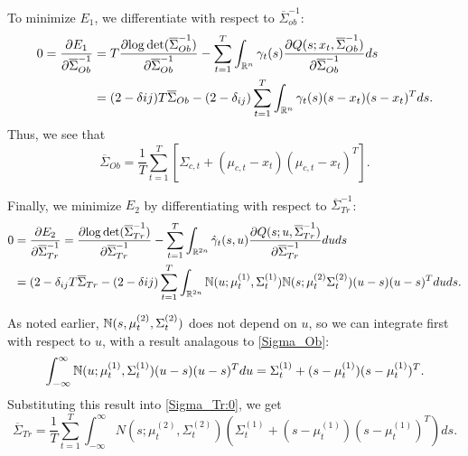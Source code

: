 \documentclass[12pt,leqno]{article}
\begin{document}
To minimize $E_1$, we differentiate with respect to $\overline{\Sigma}_{ob}^{-1}$:
\begin{align*}
  0 = \frac{\partial{E_1}}{\partial{\overline{\Sigma}_{Ob}^{-1}}} &= T\frac{\partial{\log\det(\overline{\Sigma}_{Ob}^{-1})}}{\partial\overline{\Sigma}_{Ob}^{-1}}
  - \sum_{t=1}^T\int_{{\mathbb R}^n}\gamma_t(s)\frac{\partial{Q(s;x_t,\overline{\Sigma}_{Ob}^{-1})}}{\partial{\overline{\Sigma}_{Ob}^{-1}}}ds \\
  &= (2-\delta{ij})T\overline{\Sigma}_{Ob} - (2-\delta_{ij})\sum_{t=1}^T\int_{{\mathbb R}^n}\gamma_t(s)(s-x_t)(s-x_t)^Tds.
\end{align*}
Thus,  we see that
\begin{equation}\label{Sigma_Ob}
  \overline{\Sigma}_{Ob} = \frac{1}{T}\sum_{t=1}^T [\Sigma_{c,t} + (\mu_{c,t}-x_t)(\mu_{c,t}-x_t)^T].
\end{equation}

Finally, we minimize $E_2$ by differentiating with respect to $\overline{\Sigma}_{Tr}^{-1}$:
\begin{equation}\label{Sigma_Tr:0}
  \begin{split}
  0 &= \frac{\partial{E_2}}{\partial{\overline{\Sigma}_{Tr}^{-1}}} = \frac{\partial{\log\det(\overline{\Sigma}_{Tr}^{-1})}}{\partial\overline{\Sigma}_{Tr}^{-1}}
  - \sum_{t=1}^T\int_{{\mathbb R}^{2n}}\hat{\gamma}_t(s,u)\frac{\partial{Q(s;u,\overline{\Sigma}_{Tr}^{-1})}}{\partial\overline{\Sigma}_{Tr}^{-1}}duds \\
      &= (2-\delta_{ij}T\overline{\Sigma}_{Tr} - (2-\delta{ij}) \sum_{t=1}^T\int_{{\mathbb R}^{2n}}{\mathbb N}(u;\mu^{(1)}_t,\Sigma^{(1)}_t){\mathbb N}(s;\mu^{(2)}_t\Sigma^{(2)}_t)(u-s)(u-s)^Tduds.
  \end{split}
\end{equation}

As noted earlier, ${\mathbb N}(s,\mu^{(2)}_t,\Sigma^{(2)}_t)$ does not depend on $u$, so we can integrate first with respect to $u$, with a result
analagous to \eqref{Sigma_Ob}:
$$
  \int_{-\infty}^{\infty}{\mathbb N}(u;\mu^{(1)}_t,\Sigma^{(1)}_t)(u-s)(u-s)^Tdu = \Sigma^{(1)}_t + (s-\mu^{(1)}_t)(s-\mu^{(1)}_t)^T.
$$
Substituting this result into \eqref{Sigma_Tr:0}, we get
\begin{equation}\label{Sigma_Tr:1}
  \overline{\Sigma}_{Tr} = \frac{1}{T}\sum_{t=1}^T\int_{-\infty}^{\infty}N(s;\mu^{(2)}_t,\Sigma^{(2)}_t)(\Sigma^{(1)}_t+
  (s-\mu^{(1)}_t)(s-\mu^{(1)}_t)^T)ds.
\end{equation}
\end{document}
